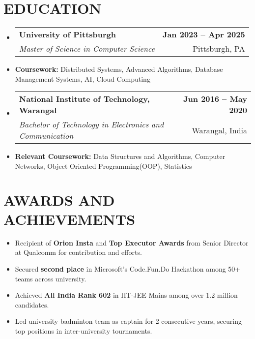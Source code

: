 \documentclass[letterpaper,10.9pt]{article}
\makeatletter
\newcommand{\resumeItem}[1]{
  \item\small{
    {#1 \vspace{-2pt}}
  }
}
\newcommand{\resumeEducationheading}[4]{
\item
    \begin{tabular*}{1.0\textwidth}[t]{l@{\extracolsep{\fill}}r}
      \hspace{-1pt}\textbf{ \small #1} & \textbf{\small #2} \\
      \textit{\small #3} & {\small #4} \\
    \end{tabular*}\vspace{-7pt}
}
\newcommand{\resumeSubSubheading}[2]{
    \vspace{-2pt}\item
    \begin{tabular*}{1.0\textwidth}{l@{\extracolsep{\fill}}r}
      \textit{#1} & \textit{#2} \\
    \end{tabular*}\vspace{-7pt}
}
\newcommand{\resumeSubHeadingListStart}{\begin{itemize}[leftmargin=0.0in, label={}]}
\newcommand{\resumeSubHeadingListEnd}{\end{itemize}}
\newcommand{\resumeItemListStart}{\begin{itemize}}
\newcommand{\resumeItemListEnd}{\end{itemize}\vspace{-7pt}}
\makeatother
\begin{document}
\section{EDUCATION} 
    \resumeSubHeadingListStart
        \resumeEducationheading
            {University of Pittsburgh}{Jan 2023 -- Apr 2025}
            {Master of Science in Computer Science}{Pittsburgh, PA}
            \resumeItem{\textbf{Coursework:} Distributed Systems, Advanced Algorithms, Database Management Systems, AI, Cloud Computing} 
        \resumeEducationheading
            {National Institute of Technology, Warangal}{Jun 2016 -- May 2020}
            {Bachelor of Technology in Electronics and Communication }{Warangal, India}
            \resumeItem{\textbf{Relevant Coursework:} Data Structures and Algorithms, Computer Networks, Object Oriented Programming(OOP), Statistics}
    \resumeSubHeadingListEnd


\section{AWARDS AND ACHIEVEMENTS}
\resumeSubHeadingListStart
    \resumeItemListStart      
        	\resumeItem{Recipient of \textbf{Orion Insta} and \textbf{Top Executor Awards} from Senior Director at Qualcomm for contribution and efforts.}
            
             \resumeItem{Secured \textbf{second place }in Microsoft's Code.Fun.Do Hackathon among 50+ teams across university.}
             
            \resumeItem{Achieved \textbf{All India Rank 602} in IIT-JEE  Mains among over 1.2 million candidates. }

            \resumeItem{Led university badminton team as captain for 2 consecutive years, securing top positions in inter-university tournaments.}
    \resumeItemListEnd
\resumeSubHeadingListEnd
            
  
\end{document}
